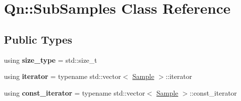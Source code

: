 \hypertarget{classQn_1_1SubSamples}{}\section{Qn\+:\+:Sub\+Samples Class Reference}
\label{classQn_1_1SubSamples}
\subsection*{Public Types}
\begin{DoxyCompactItemize}
\item 
\mbox{\label{classQn_1_1SubSamples_a1e6fb63f4dcefa7c3b8ef566be2c9040}} 
using {\bfseries size\+\_\+type} = std\+::size\+\_\+t
\item 
\mbox{\label{classQn_1_1SubSamples_a686140e560cc4ce44667ffec007e257b}} 
using {\bfseries iterator} = typename std\+::vector$<$ \mbox{\hyperlink{structQn_1_1Sample}{Sample}} $>$\+::iterator
\item 
\mbox{\label{classQn_1_1SubSamples_acb0b62cc8e22fb6f673ff946a7035a1b}} 
using {\bfseries const\+\_\+iterator} = typename std\+::vector$<$ \mbox{\hyperlink{structQn_1_1Sample}{Sample}} $>$\+::const\+\_\+iterator
\end{DoxyCompactItemize}
